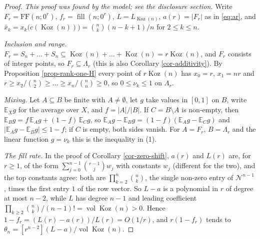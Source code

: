 \documentclass[11pt, a4paper, abstract=yes]{scrartcl}
\theoremstyle{definition}
\theoremstyle{remark}
\theoremstyle{plain}
\theoremstyle{remark}
\theoremstyle{plain}
\newcommand{\Koz}{\operatorname{Koz}}
\newcommand{\FF}{\mathrm{FF}}
\newcommand{\vol}{\operatorname{vol}}
\begin{document}
\begin{proof}
\emph{This proof was found by the model; see the disclosure section.} Write \(F_r=\FF(n;0^r)\),
\(f_r=\operatorname{fill}(n;0^r)\), \(L=L_{\Koz(n)}\), \(a(r)=\lvert F_r\rvert\) as in \eqref{eq:ar}, and
\(\bar x_k=x_k\bigl(c(\Koz(n))\bigr)=\binom nk(n-k+1)/n\) for \(2\le k\le n\).

\emph{Inclusion and range.} \(F_r=S_n+\dots+S_n\subseteq\Koz(n)+\dots+\Koz(n)=r\Koz(n)\), and \(F_r\)
consists of integer points, so \(F_r\subseteq\Lambda_r\) (this is also Corollary \ref{cor-additivity}).
By Proposition \ref{prop-rank-one-H} every point of \(r\Koz(n)\) has \(x_0=r\), \(x_1=nr\) and
\(r\ge x_2/\binom n2\ge\dots\ge x_n/\binom nn\ge0\), so \(0\le\nu_k\le1\) on \(\Lambda_r\).

\emph{Mixing.} Let \(A\subseteq B\) be finite with \(A\ne\emptyset\), let \(g\) take values in \([0,1]\) on
\(B\), write \(\mathbb E_Xg\) for the average over \(X\), and \(f=\lvert A\rvert/\lvert B\rvert\). If
\(C=B\setminus A\) is non-empty, then \(\mathbb E_Bg=f\,\mathbb E_Ag+(1-f)\,\mathbb E_Cg\), so
\(\mathbb E_Ag-\mathbb E_Bg=(1-f)(\mathbb E_Ag-\mathbb E_Cg)\) and
\(\lvert\mathbb E_Ag-\mathbb E_Bg\rvert\le1-f\); if \(C\) is empty, both sides vanish. For \(A=F_r\),
\(B=\Lambda_r\) and the linear function \(g=\nu_k\) this is the inequality in (1).

\emph{The fill rate.} In the proof of Corollary \ref{cor-zero-shift}, \(a(r)\) and \(L(r)\) are, for \(r\ge1\),
of the form \(\sum_{j=0}^{n-1}\binom{r-1}jw_j\) with constants \(w_j\) (different for the two), and the
top constants agree: both are \(\prod_{k=2}^n\binom nk\), the single non-zero entry of
\(\mathcal N^{n-1}\), times the first entry \(1\) of the row vector. So \(L-a\) is a polynomial in
\(r\) of degree at most \(n-2\), while \(L\) has degree \(n-1\) and leading coefficient
\(\prod_{k\ge2}\binom nk/(n-1)!=\vol\Koz(n)>0\). Hence \(1-f_r=(L(r)-a(r))/L(r)=O(1/r)\), and
\(r(1-f_r)\) tends to \(\theta_n=[r^{n-2}](L-a)/\vol\Koz(n)\).


\end{proof}
\end{document}
